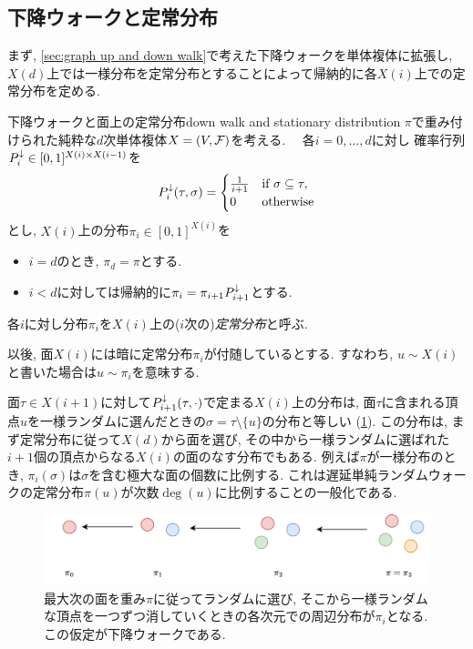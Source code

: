 \subsection{下降ウォークと定常分布}
まず, \cref{sec:graph up and down walk}で考えた下降ウォークを単体複体に拡張し, $X(d)$上では一様分布を定常分布とすることによって帰納的に各$X(i)$上での定常分布を定める.
\begin{definition}{下降ウォークと面上の定常分布}{down walk and stationary distribution}
    $\pi$で重み付けられた純粋な$d$次単体複体$X=(V,\mathcal{F})$を考える.　
    各$i=0,\dots,d$に対し
        確率行列$P^{\downarrow}_i \in [0,1]^{X(i) \times X(i-1)}$を
        \[
            P^{\downarrow}_i(\tau,\sigma) = \begin{cases}
                \frac{1}{i+1}	& \text{if } \sigma \subseteq \tau,\\
                0 & \text{otherwise}
            \end{cases}
        \]
        とし, $X(i)$上の分布$\pi_i \in [0,1]^{X(i)}$を
        \begin{itemize}
        \item $i=d$のとき, $\pi_d = \pi$とする.
        \item $i<d$に対しては帰納的に$\pi_i = \pi_{i+1}P^{\downarrow}_{i+1}$とする.
        \end{itemize}
    各$i$に対し分布$\pi_i$を$X(i)$上の($i$次の)\emph{定常分布}と呼ぶ.

    以後, 面$X(i)$には暗に定常分布$\pi_i$が付随しているとする.
    すなわち, $u \sim X(i)$と書いた場合は$u\sim \pi_i$を意味する.
\end{definition}
面$\tau \in X(i+1)$に対して$P^{\downarrow}_{i+1}(\tau,\cdot)$で定まる$X(i)$上の分布は, 面$\tau$に含まれる頂点$u$を一様ランダムに選んだときの$\sigma = \tau \setminus\{u\}$の分布と等しい (\cref{fig:stationary_distribution}).
この分布は, まず定常分布に従って$X(d)$から面を選び, その中から一様ランダムに選ばれた$i+1$個の頂点からなる$X(i)$の面のなす分布でもある.
例えば$\pi$が一様分布のとき, $\pi_i(\sigma)$は$\sigma$を含む極大な面の個数に比例する.
これは遅延単純ランダムウォークの定常分布$\pi(u)$が次数$\deg(u)$に比例することの一般化である.

\begin{figure}[htbp]
    \begin{center}
    \includegraphics[width=\linewidth]{images/stationary_distribution.png}
    \caption{最大次の面を重み$\pi$に従ってランダムに選び, そこから一様ランダムな頂点を一つずつ消していくときの各次元での周辺分布が$\pi_i$となる. この仮定が下降ウォークである. \label{fig:stationary_distribution}}
    \end{center}
\end{figure}



